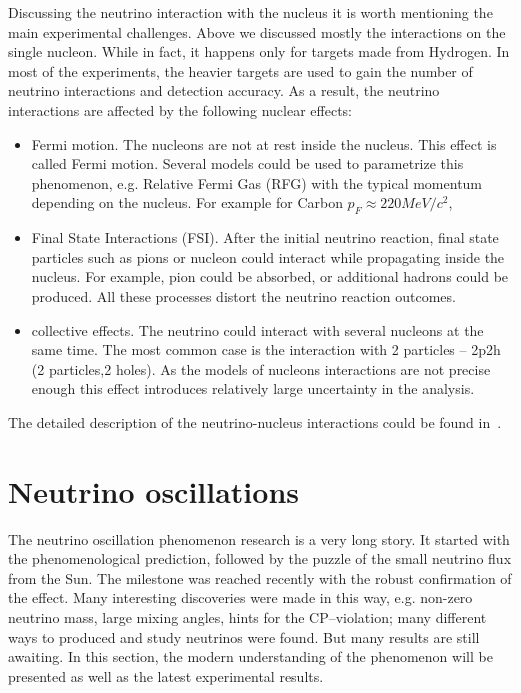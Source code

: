 \documentclass[../main.tex]{subfiles}
\begin{document}
Discussing the neutrino interaction with the nucleus it is worth mentioning the main experimental challenges. Above we discussed mostly the interactions on the single nucleon. While in fact, it happens only for targets made from Hydrogen. In most of the experiments, the heavier targets are used to gain the number of neutrino interactions and detection accuracy. As a result, the neutrino interactions are affected by the following nuclear effects:
\begin{itemize}
  \item Fermi motion. The nucleons are not at rest inside the nucleus. This effect is called Fermi motion. Several models could be used to parametrize this phenomenon, e.g. Relative Fermi Gas (RFG) with the typical momentum depending on the nucleus. For example for Carbon $p_F\approx 220 MeV/c^2$,
  \item Final State Interactions (FSI). After the initial neutrino reaction, final state particles such as pions or nucleon could interact while propagating inside the nucleus. For example, pion could be absorbed, or additional hadrons could be produced. All these processes distort the neutrino reaction outcomes.
  \item collective effects. The neutrino could interact with several nucleons at the same time. The most common case is the interaction with 2 particles -- 2p2h (2 particles,2 holes). As the models of nucleons interactions are not precise enough this effect introduces relatively large uncertainty in the analysis.
\end{itemize}

The detailed description of the neutrino-nucleus interactions could be found in~\cite{Formaggio2012}.


\section{Neutrino oscillations}
\label{sec:intro:osc}
The neutrino oscillation phenomenon research is a very long story. It started with the phenomenological prediction, followed by the puzzle of the small neutrino flux from the Sun. The milestone was reached recently with the robust confirmation of the effect. Many interesting discoveries were made in this way, e.g. non-zero neutrino mass, large mixing angles, hints for the CP--violation; many different ways to produced and study neutrinos were found. But many results are still awaiting. In this section, the modern understanding of the phenomenon will be presented as well as the latest experimental results.
\end{document}
